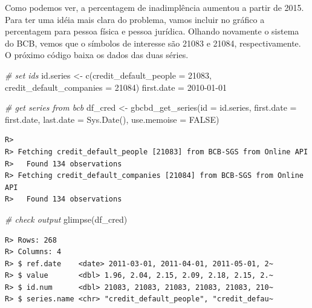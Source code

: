 \documentclass[
  11pt,
]{book}
\newenvironment{Shaded}{\begin{snugshade}}{\end{snugshade}}
\newcommand{\AttributeTok}[1]{\textcolor[rgb]{0.61,0.61,0.61}{#1}}
\newcommand{\CommentTok}[1]{\textcolor[rgb]{0.37,0.37,0.37}{\textit{#1}}}
\newcommand{\ConstantTok}[1]{\textcolor[rgb]{0,0,0}{#1}}
\newcommand{\DecValTok}[1]{\textcolor[rgb]{0.06,0.06,0.06}{#1}}
\newcommand{\FunctionTok}[1]{\textcolor[rgb]{0,0,0}{#1}}
\newcommand{\NormalTok}[1]{#1}
\newcommand{\OtherTok}[1]{\textcolor[rgb]{0.37,0.37,0.37}{#1}}
\newcommand{\StringTok}[1]{\textcolor[rgb]{0.5,0.5,0.5}{#1}}
\begin{document}
Como podemos ver, a percentagem de inadimplência aumentou a partir de 2015. Para ter uma idéia mais clara do problema, vamos incluir no gráfico a percentagem para pessoa física e pessoa jurídica. Olhando novamente o sistema do BCB, vemos que o símbolos de interesse são 21083 e 21084, respectivamente. O próximo código baixa os dados das duas séries.

\begin{Shaded}
\begin{Highlighting}[]
\CommentTok{\# set ids}
\NormalTok{id.series }\OtherTok{\textless{}{-}} \FunctionTok{c}\NormalTok{(}\AttributeTok{credit\_default\_people =} \DecValTok{21083}\NormalTok{,}
               \AttributeTok{credit\_default\_companies =} \DecValTok{21084}\NormalTok{)}
\NormalTok{first.date }\OtherTok{=} \StringTok{\textquotesingle{}2010{-}01{-}01\textquotesingle{}}

\CommentTok{\# get series from bcb}
\NormalTok{df\_cred }\OtherTok{\textless{}{-}} \FunctionTok{gbcbd\_get\_series}\NormalTok{(}\AttributeTok{id =}\NormalTok{ id.series,}
                            \AttributeTok{first.date =}\NormalTok{ first.date,}
                            \AttributeTok{last.date =} \FunctionTok{Sys.Date}\NormalTok{(), }
                            \AttributeTok{use.memoise =} \ConstantTok{FALSE}\NormalTok{)}
\end{Highlighting}
\end{Shaded}

\begin{verbatim}
R> 
R> Fetching credit_default_people [21083] from BCB-SGS from Online API 
R>   Found 134 observations
R> Fetching credit_default_companies [21084] from BCB-SGS from Online API 
R>   Found 134 observations
\end{verbatim}

\begin{Shaded}
\begin{Highlighting}[]
\CommentTok{\# check output}
\FunctionTok{glimpse}\NormalTok{(df\_cred)}
\end{Highlighting}
\end{Shaded}

\begin{verbatim}
R> Rows: 268
R> Columns: 4
R> $ ref.date    <date> 2011-03-01, 2011-04-01, 2011-05-01, 2~
R> $ value       <dbl> 1.96, 2.04, 2.15, 2.09, 2.18, 2.15, 2.~
R> $ id.num      <dbl> 21083, 21083, 21083, 21083, 21083, 210~
R> $ series.name <chr> "credit_default_people", "credit_defau~
\end{verbatim}
\end{document}
